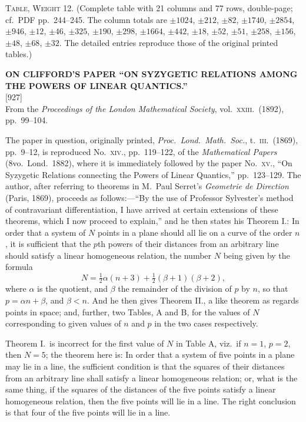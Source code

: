 \documentclass[11pt,a4paper]{article}
\newcommand{\paper}[3]{%
  \clearpage
  \begin{center}
    {\large\bfseries #2}\\[0.5em]
    {\small [#1]}\\[0.3em]
    {\small #3}
  \end{center}
  \vspace{0.5em}
}
\begin{document}
\medskip

\textsc{Table, Weight 12.} {\small (Complete table with 21 columns and 77 rows, double-page; cf.\ PDF pp.\ 244--245. The column totals are $\pm 1024$, $\pm 212$, $\pm 82$, $\pm 1740$, $\pm 2854$, $\pm 946$, $\pm 12$, $\pm 46$, $\pm 325$, $\pm 190$, $\pm 298$, $\pm 1664$, $\pm 442$, $\pm 18$, $\pm 52$, $\pm 51$, $\pm 258$, $\pm 156$, $\pm 48$, $\pm 68$, $\pm 32$. The detailed entries reproduce those of the original printed tables.)}

\paper{927}{ON CLIFFORD'S PAPER ``ON SYZYGETIC RELATIONS AMONG THE POWERS OF LINEAR QUANTICS.''}{From the \textit{Proceedings of the London Mathematical Society}, vol.\ \textsc{xxiii}.\ (1892), pp.\ 99--104.}

The paper in question, originally printed, \textit{Proc.\ Lond.\ Math.\ Soc.}, t.\ \textsc{iii}.\ (1869), pp.\ 9--12, is reproduced No.\ \textsc{xiv}., pp.\ 119--122, of the \textit{Mathematical Papers} (8vo.\ Lond.\ 1882), where it is immediately followed by the paper No.\ \textsc{xv}., ``On Syzygetic Relations connecting the Powers of Linear Quantics,'' pp.\ 123--129. The author, after referring to theorems in M.\ Paul Serret's \textit{Geometrie de Direction} (Paris, 1869), proceeds as follows:---``By the use of Professor Sylvester's method of contravariant differentiation, I have arrived at certain extensions of these theorems, which I now proceed to explain,'' and he then states his Theorem I.: In order that a system of $N$ points in a plane should all lie on a curve of the order $n$, it is sufficient that the $p$th powers of their distances from an arbitrary line should satisfy a linear homogeneous relation, the number $N$ being given by the formula
\[
N = \tfrac{1}{2}\alpha(n + 3) + \tfrac{1}{2}(\beta + 1)(\beta + 2),
\]
where $\alpha$ is the quotient, and $\beta$ the remainder of the division of $p$ by $n$, so that $p = \alpha n + \beta$, and $\beta < n$. And he then gives Theorem II., a like theorem as regards points in space; and, further, two Tables, A and B, for the values of $N$ corresponding to given values of $n$ and $p$ in the two cases respectively.

Theorem I.\ is incorrect for the first value of $N$ in Table A, viz.\ if $n = 1$, $p = 2$, then $N = 5$; the theorem here is: In order that a system of five points in a plane may lie in a line, the sufficient condition is that the squares of their distances from an arbitrary line shall satisfy a linear homogeneous relation; or, what is the same thing, if the squares of the distances of the five points satisfy a linear homogeneous relation, then the five points will lie in a line. The right conclusion is that four of the five points will lie in a line.
\end{document}

